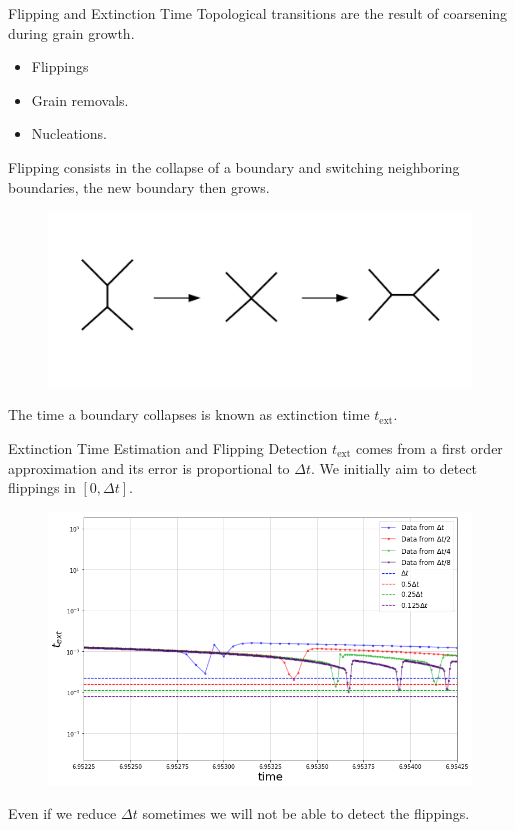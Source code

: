 \documentclass[usenames,dvipsnames]{beamer}
\begin{document}
\begin{frame}{Flipping and Extinction Time}
Topological transitions are the result of coarsening during grain growth.
\begin{itemize}
  \item Flippings
  \item Grain removals.
  \item Nucleations.
\end{itemize}
Flipping consists in the collapse of a boundary and switching neighboring boundaries, the new boundary then grows.
\begin{figure}
    \centering
    \includegraphics[scale=0.5]{figures/coupled_model/flipping.pdf}
\end{figure}
The time a boundary collapses is known as extinction time $t_\text{ext}$.
\end{frame}


\begin{frame}{Extinction Time Estimation and Flipping Detection}
$t_{\text{ext}}$ comes from a first order approximation and its error is proportional to $\Delta t$. We initially aim to detect flippings in $[0,\Delta t]$.
\begin{figure}
    \centering
    \includegraphics[scale=0.3]{figures/coupled_model/image_preview.png}
\end{figure}
Even if we reduce $\Delta t$ sometimes we will not be able to detect the flippings.
\end{frame}
\end{document}
